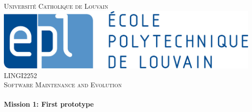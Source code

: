     \begin{titlepage}
        \center %


        \textsc{\LARGE Université Catholique de Louvain }\\[0.8cm] %
        \includegraphics[scale=0.45]{epl.jpg}
         \\[1.5cm]
        \textsc{\Large LINGI2252}\\[0.5cm] %
        \textsc{\large Software Maintenance and Evolution}\\[0.8cm] %


        \HRule \\[0.4cm]
        { \huge \bfseries Mission 1: First prototype}\\[0.2cm] %
        \HRule \\[1.5cm]



\end{titlepage}
